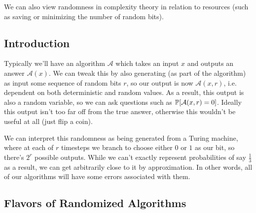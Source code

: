 \documentclass[11 pt]{scrartcl}
\begin{document}
We can also view randomness in complexity theory in relation to resources (such as saving or minimizing the number of random bits).  

\subsection{Introduction}
Typically we'll have an algorithm $\mathcal{A}$ which takes an input $x$ and outputs an answer $\mathcal{A}(x)$. We can tweak this by also generating (as part of the algorithm) as input some sequence of random bits $r$, so our output is now $\mathcal{A}(x, r)$, i.e. dependent on both deterministic and random values. As a result, this output is also a random variable, so we can ask questions such as $\mathbb P[\mathcal{A}(x,r) = 0]$.
    Ideally this output isn't too far off from the true answer, otherwise this wouldn't be useful at all (just flip a coin). 

We can interpret this randomness as being generated from a Turing machine, where at each of $r$ timesteps we branch to choose either $0$ or $1$ as our bit, so there's $2^r$ possible outputs. While we can't exactly represent probabilities of say $\frac 13$ as a result, we can get arbitrarily close to it by approximation. In other words, all of our algorithms will have some errors associated with them. 

\subsection{Flavors of Randomized Algorithms}
\end{document}
